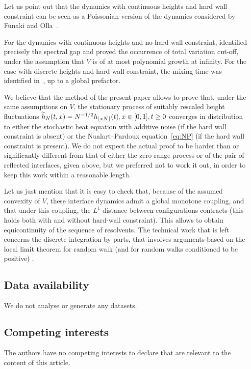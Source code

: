 \documentclass[10pt]{amsart}
\theoremstyle{definition}\newtheorem{defi}[theo]{Definition}\newtheorem{rema}[theo]{Remark}\newtheorem{exam}[theo]{Example}\newtheorem{exem}[theo]{Example}\newtheorem{nota}[theo]{Notation}
\theoremstyle{plain}
\let\oldtilde\tilde
\renewcommand*{\tilde}[1]{\mathchoice{\widetilde{#1}}{\widetilde{#1}}{\oldtilde{#1}}{\oldtilde{#1}}}
\begin{document}
Let us point out that the dynamics with continuous heights and hard wall constraint can be seen as a Poissonian version of the dynamics considered by Funaki and Olla~\cite{FunaOlla}.

For the dynamics with continuous heights and no hard-wall constraint, \cite{caputo2022spectral} identified precisely the spectral gap and proved the occurrence of total variation cut-off, under the assumption that $V$ is of at most polynomial growth at infinity. For the case with discrete heights and hard-wall constraint, the mixing time was identified in~\cite[Section~3]{martinelli2009mixing}, up to a global prefactor.

We believe that the method of the present paper allows to prove that, under the same assumptions on $V$, the stationary process of suitably rescaled height fluctuations $\tilde h_N(t,x)=N^{-1/2}h_{\lfloor x N\rfloor}(t), x\in[0,1],t\ge0$ converges in distribution to either the stochastic heat equation with additive noise (if the hard wall constraint is absent) or the Nualart--Pardoux equation~\eqref{eq:NP} (if the hard wall constraint is present). We do not expect the actual proof to be harder than or significantly different from that of either the zero-range process or of the pair of reflected interfaces, given above, but we preferred not to work it out, in order to keep this work within a reasonable length.

Let us just mention that it is easy to check that, because of the assumed convexity of $V$, these interface dynamics admit a global monotone coupling, and that under this coupling, the $L^1$ distance between configurations contracts (this holds both with and without hard-wall constraint). This allows to obtain equicontinuity of the sequence of resolvents. The technical work that is left concerns the discrete integration by parts, that involves arguments based on the local limit theorem for random walk (and for random walks conditioned to be positive) \cite{bryn2006functional,caravenna2008invariance}.

\subsection*{Data availability}
We do not analyse or generate any datasets.

\subsection*{Competing interests}
The authors have no competing interests to declare that are relevant to the content of this article.
\end{document}
